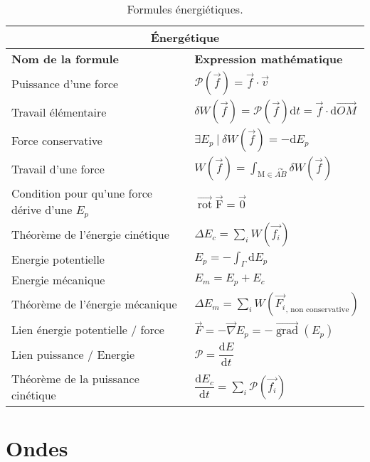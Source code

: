 \documentclass[10pt,a4paper,titlepage,portrait]{article}
\renewcommand{\d}
{
    \mathrm{d}
}
\newcommand*{\dv}[2]
{
    \dfrac{\d#1}{\d#2}
}
\newcommand{\rot}
{
    \vec{\operatorname{rot}}
}
\newcommand{\grad}
{
    \vec{\operatorname{grad}}
}
\renewcommand{\arraystretch}{2}
\begin{document}
\begin{table}[H]
    \centering
    \renewcommand{\arraystretch}{1.5} %
    \setlength{\tabcolsep}{8pt} %
    \begin{tabular}{@{}p{9cm}p{10cm}@{}}
        \toprule
        \multicolumn{2}{c}{\textbf{Énergétique}} \\
        \midrule
        \textbf{Nom de la formule} & \textbf{Expression mathématique} \\
        \midrule
    Puissance d'une force & $\mathcal{P}(\vec{f}) = \vec{f} \cdot \vec{v}$ \\ 
    Travail élémentaire & $\delta W(\vec{f}) = \mathcal{P}(\vec{f})\text{d}t=\vec{f}\cdot \text{d}\vec{OM}$ \\ 
    Force conservative & $\exists E_{p} \ | \ \delta W(\vec{f}) = -\text{d}E_{p}$ \\ 
    Travail d'une force & $\displaystyle W(\vec{f}) = \int_{\text{M}\in\overset{\curvearrowright}{AB}}\delta W(\vec{f})$ \\ 
    Condition pour qu'une force dérive d'une $E_p$ & $\rot{\vec{\text{F}}} = \vec{0}$ \\ 
    Théorème de l'énergie cinétique & $\displaystyle \Delta E_c = \sum\limits_{i}W(\vec{f_i})$ \\ 
    Energie potentielle & $\displaystyle E_p = -\int_{\Gamma}\text{d}E_p$ \\ 
    Energie mécanique & $E_m = E_p + E_c$ \\ 
    Théorème de l'énergie mécanique & $\displaystyle \Delta E_m = \sum_{i}W(\vec{F_i}_{\text{, non conservative}})$ \\ 
    Lien énergie potentielle / force & $\vec{F} = -\vec{\nabla} E_p = -\grad(E_p)$ \\ 
    Lien puissance / Energie & $\mathcal{P} = \dv{E}{t}$ \\ 
    Théorème de la puissance cinétique & $\displaystyle \dv{E_c}{t} = \sum_{i}\mathcal{P}(\vec{f_i})$ \\ 
    \bottomrule
\end{tabular}
\caption{Formules énergiétiques.}
\label{tab:energetique}
\end{table}


\section{Ondes}
\end{document}
